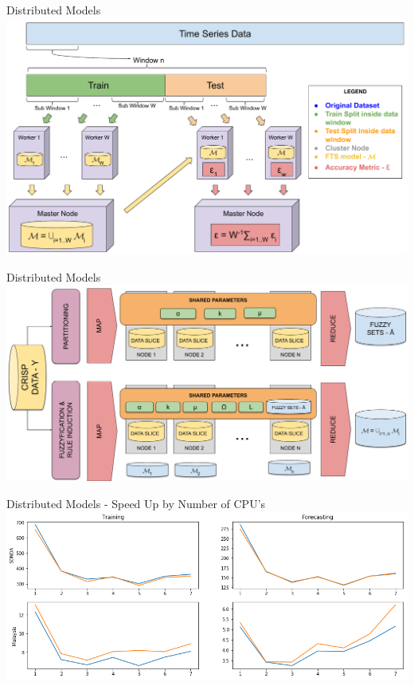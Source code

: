 \documentclass{beamer}
\begin{document}
\begin{frame}{Distributed Models}
\includegraphics[width=\textwidth]{figures/distributed_models.pdf}
\end{frame}

\begin{frame}{Distributed Models}
\includegraphics[width=\textwidth]{figures/distributed_models_training.pdf}
\end{frame}

\begin{frame}{Distributed Models - Speed Up by Number of CPU's}
\includegraphics[width=\textwidth]{figures/speed_up.png}
\end{frame}
\end{document}
